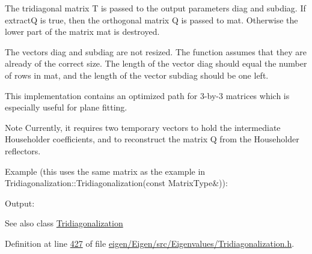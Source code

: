 The tridiagonal matrix T is passed to the output parameters {\ttfamily diag} and {\ttfamily subdiag}. If {\ttfamily extractQ} is true, then the orthogonal matrix Q is passed to {\ttfamily mat}. Otherwise the lower part of the matrix {\ttfamily mat} is destroyed.

The vectors {\ttfamily diag} and {\ttfamily subdiag} are not resized. The function assumes that they are already of the correct size. The length of the vector {\ttfamily diag} should equal the number of rows in {\ttfamily mat}, and the length of the vector {\ttfamily subdiag} should be one left.

This implementation contains an optimized path for 3-\/by-\/3 matrices which is especially useful for plane fitting.

\begin{DoxyNote}{Note}
Currently, it requires two temporary vectors to hold the intermediate Householder coefficients, and to reconstruct the matrix Q from the Householder reflectors.
\end{DoxyNote}
Example (this uses the same matrix as the example in Tridiagonalization\+::\+Tridiagonalization(const Matrix\+Type\&))\+: 
\begin{DoxyCodeInclude}
\end{DoxyCodeInclude}
 Output\+: 
\begin{DoxyVerbInclude}
\end{DoxyVerbInclude}


\begin{DoxySeeAlso}{See also}
class \hyperlink{group___eigenvalues___module_class_eigen_1_1_tridiagonalization}{Tridiagonalization} 
\end{DoxySeeAlso}


Definition at line \hyperlink{eigen_2_eigen_2src_2_eigenvalues_2_tridiagonalization_8h_source_l00427}{427} of file \hyperlink{eigen_2_eigen_2src_2_eigenvalues_2_tridiagonalization_8h_source}{eigen/\+Eigen/src/\+Eigenvalues/\+Tridiagonalization.\+h}.

